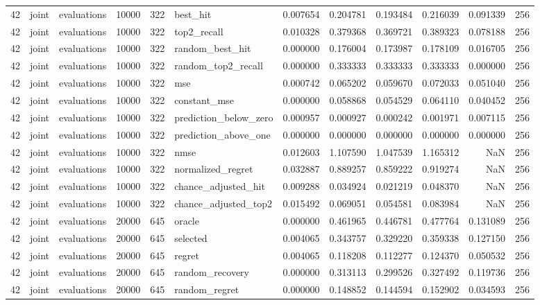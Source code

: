 \begin{tabular}{rllrrlrrrrrr}
42 & joint & evaluations & 10000 & 322 & best_hit & 0.007654 & 0.204781 & 0.193484 & 0.216039 & 0.091339 & 256 \\
42 & joint & evaluations & 10000 & 322 & top2_recall & 0.010328 & 0.379368 & 0.369721 & 0.389323 & 0.078188 & 256 \\
42 & joint & evaluations & 10000 & 322 & random_best_hit & 0.000000 & 0.176004 & 0.173987 & 0.178109 & 0.016705 & 256 \\
42 & joint & evaluations & 10000 & 322 & random_top2_recall & 0.000000 & 0.333333 & 0.333333 & 0.333333 & 0.000000 & 256 \\
42 & joint & evaluations & 10000 & 322 & mse & 0.000742 & 0.065202 & 0.059670 & 0.072033 & 0.051040 & 256 \\
42 & joint & evaluations & 10000 & 322 & constant_mse & 0.000000 & 0.058868 & 0.054529 & 0.064110 & 0.040452 & 256 \\
42 & joint & evaluations & 10000 & 322 & prediction_below_zero & 0.000957 & 0.000927 & 0.000242 & 0.001971 & 0.007115 & 256 \\
42 & joint & evaluations & 10000 & 322 & prediction_above_one & 0.000000 & 0.000000 & 0.000000 & 0.000000 & 0.000000 & 256 \\
42 & joint & evaluations & 10000 & 322 & nmse & 0.012603 & 1.107590 & 1.047539 & 1.165312 & NaN & 256 \\
42 & joint & evaluations & 10000 & 322 & normalized_regret & 0.032887 & 0.889257 & 0.859222 & 0.919274 & NaN & 256 \\
42 & joint & evaluations & 10000 & 322 & chance_adjusted_hit & 0.009288 & 0.034924 & 0.021219 & 0.048370 & NaN & 256 \\
42 & joint & evaluations & 10000 & 322 & chance_adjusted_top2 & 0.015492 & 0.069051 & 0.054581 & 0.083984 & NaN & 256 \\
42 & joint & evaluations & 20000 & 645 & oracle & 0.000000 & 0.461965 & 0.446781 & 0.477764 & 0.131089 & 256 \\
42 & joint & evaluations & 20000 & 645 & selected & 0.004065 & 0.343757 & 0.329220 & 0.359338 & 0.127150 & 256 \\
42 & joint & evaluations & 20000 & 645 & regret & 0.004065 & 0.118208 & 0.112277 & 0.124370 & 0.050532 & 256 \\
42 & joint & evaluations & 20000 & 645 & random_recovery & 0.000000 & 0.313113 & 0.299526 & 0.327492 & 0.119736 & 256 \\
42 & joint & evaluations & 20000 & 645 & random_regret & 0.000000 & 0.148852 & 0.144594 & 0.152902 & 0.034593 & 256 \\

\end{tabular}
